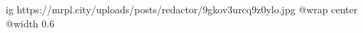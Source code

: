 
 
 
 
 

\ifcmt
  ig https://mrpl.city/uploads/posts/redactor/9gkov3urcq9z0ylo.jpg
  @wrap center
  @width 0.6
\fi
